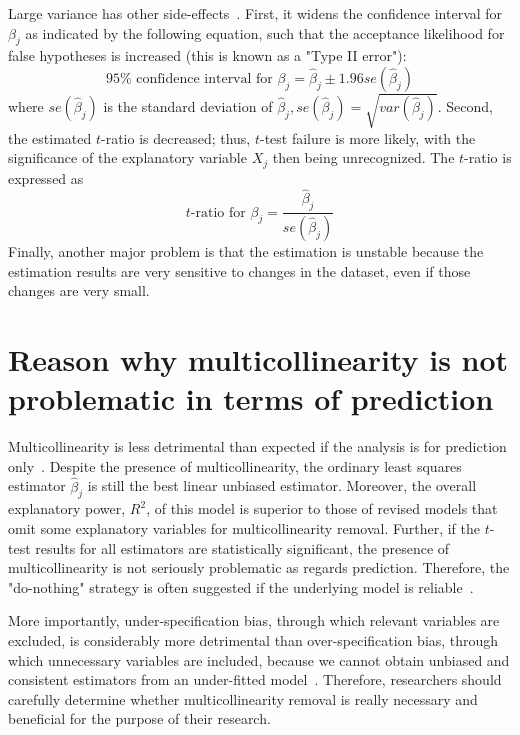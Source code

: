 Large variance has other side-effects~\cite{gujarati2009basic}. First, it widens the confidence interval for $\beta_j$ as indicated by the following equation, such that the acceptance likelihood for false hypotheses is increased (this is known as a "Type II error"): 
\begin{equation}
    95\% \textrm{ confidence} \textrm{ interval} \textrm{ for } \beta_j = \hat{\beta}_j \pm 1.96se(\hat{\beta}_j)
\end{equation}
where $se(\hat{\beta}_j)$ is the standard deviation of $\hat{\beta}_j, se(\hat{\beta}_j) = \sqrt{var(\hat{\beta}_j)}$.
Second, the estimated $t$-ratio is decreased; thus, $t$-test failure is more likely, with the significance of the explanatory variable $X_j$ then being unrecognized. The $t$-ratio is expressed as
\begin{equation}
    t\textrm{-ratio for } \beta_j = \frac{\hat{\beta}_j}{se(\hat{\beta}_j)}
\end{equation}
Finally, another major problem is that the estimation is unstable because the estimation results are very sensitive to changes in the dataset, even if those changes are very small.

\section{ Reason why multicollinearity is not problematic in terms of prediction}
\label{predictionofmulticollinearity}
Multicollinearity is less detrimental than expected if the analysis is for prediction only~\cite{gujarati2009basic}. Despite the presence of multicollinearity, the ordinary least squares estimator $\hat{\beta}_j$ is still the best linear unbiased estimator. Moreover, the overall explanatory power, $R^2$, of this model is superior to those of revised models that omit some explanatory variables for multicollinearity removal. Further, if the $t$-test results for all estimators are statistically significant, the presence of multicollinearity is not seriously problematic as regards prediction. Therefore, the "do-nothing" strategy is often suggested if the underlying model is reliable~\cite{gujarati2009basic}.

More importantly, under-specification bias, through which relevant variables are excluded, is considerably more detrimental than over-specification bias, through which unnecessary variables are included, because we cannot obtain unbiased and consistent estimators from an under-fitted model~\cite{gujarati2009basic}. Therefore, researchers should carefully determine whether multicollinearity removal is really necessary and beneficial for the purpose of their research. %

